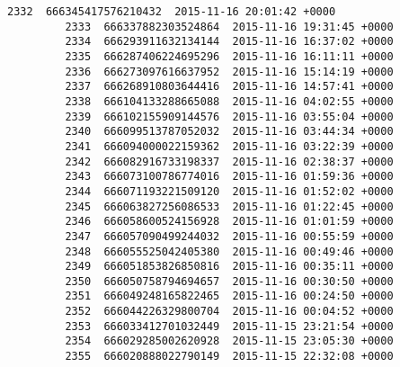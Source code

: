 \documentclass[11pt]{article}
\begin{document}
\begin{Verbatim}[commandchars=\\\{\}]
         2332  666345417576210432  2015-11-16 20:01:42 +0000   
         2333  666337882303524864  2015-11-16 19:31:45 +0000   
         2334  666293911632134144  2015-11-16 16:37:02 +0000   
         2335  666287406224695296  2015-11-16 16:11:11 +0000   
         2336  666273097616637952  2015-11-16 15:14:19 +0000   
         2337  666268910803644416  2015-11-16 14:57:41 +0000   
         2338  666104133288665088  2015-11-16 04:02:55 +0000   
         2339  666102155909144576  2015-11-16 03:55:04 +0000   
         2340  666099513787052032  2015-11-16 03:44:34 +0000   
         2341  666094000022159362  2015-11-16 03:22:39 +0000   
         2342  666082916733198337  2015-11-16 02:38:37 +0000   
         2343  666073100786774016  2015-11-16 01:59:36 +0000   
         2344  666071193221509120  2015-11-16 01:52:02 +0000   
         2345  666063827256086533  2015-11-16 01:22:45 +0000   
         2346  666058600524156928  2015-11-16 01:01:59 +0000   
         2347  666057090499244032  2015-11-16 00:55:59 +0000   
         2348  666055525042405380  2015-11-16 00:49:46 +0000   
         2349  666051853826850816  2015-11-16 00:35:11 +0000   
         2350  666050758794694657  2015-11-16 00:30:50 +0000   
         2351  666049248165822465  2015-11-16 00:24:50 +0000   
         2352  666044226329800704  2015-11-16 00:04:52 +0000   
         2353  666033412701032449  2015-11-15 23:21:54 +0000   
         2354  666029285002620928  2015-11-15 23:05:30 +0000   
         2355  666020888022790149  2015-11-15 22:32:08 +0000   
         

\end{Verbatim}
\end{document}
